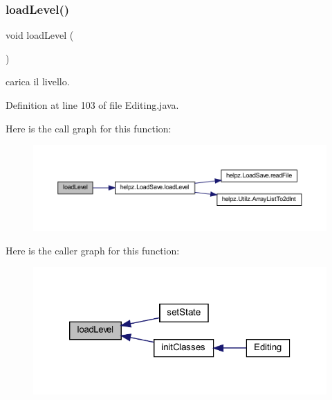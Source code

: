 \subsubsection{\texorpdfstring{load\+Level()}{loadLevel()}}
{\footnotesize\ttfamily void load\+Level (\begin{DoxyParamCaption}{ }\end{DoxyParamCaption})}



carica il livello. 



Definition at line 103 of file Editing.\+java.

Here is the call graph for this function\+:
\nopagebreak
\begin{figure}[H]
\begin{center}
\leavevmode
\includegraphics[width=350pt]{classscenes_1_1_editing_a286931cc46e197f4a85af7229fdc29a4_cgraph}
\end{center}
\end{figure}
Here is the caller graph for this function\+:\nopagebreak
\begin{figure}[H]
\begin{center}
\leavevmode
\includegraphics[width=320pt]{classscenes_1_1_editing_a286931cc46e197f4a85af7229fdc29a4_icgraph}
\end{center}
\end{figure}
\mbox{\label{classscenes_1_1_editing_a45d56bd84238e8b56589dfc732e2b2cf}} 
